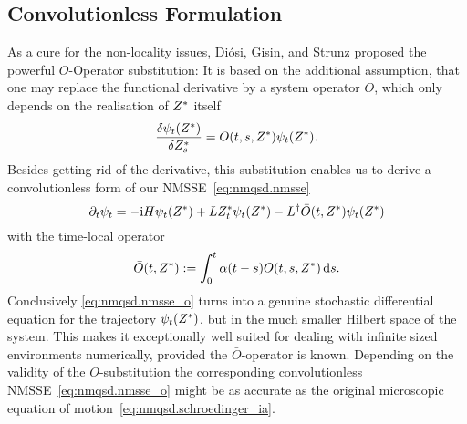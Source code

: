 \subsection{Convolutionless Formulation}
\label{sub:nmqsd.lin_nmsse.convolutionless}

As a cure for the non-locality issues, Diósi, Gisin, and Strunz \cite{DiGiSt98_nmqsd} proposed the powerful $O$-Operator substitution:
It is based on the additional assumption, that one may replace the functional derivative by a system operator $O$, which only depends on the realisation of ${Z}^*$ itself
\begin{equation}
  \frac{\delta \psi_t({Z}^*)}{\delta {Z}^*_s} = O(t, s, {Z}^*) \psi_t({Z}^*).
  \label{eq:nmqsd.o_substition}
\end{equation}
Besides getting rid of the derivative, this substitution enables us to derive a convolutionless form of our NMSSE~\ref{eq:nmqsd.nmsse}
\begin{equation}
  \partial_t \psi_t = -\mathrm{i}H\psi_t({Z}^*)  +  L{Z}^*_t\psi_t({Z}^*)  -  L^\dagger \bar O(t, {Z}^*) \psi_t({Z}^*)
  \label{eq:nmqsd.nmsse_o}
\end{equation}
with the time-local operator
\begin{equation}
  \bar O(t, {Z}^*) := \int_0^t \alpha(t - s) O(t, s, {Z}^*) \, \mathrm{d} s.
  \label{eq:nmqsd.o_bar}
\end{equation}
Conclusively \autoref{eq:nmqsd.nmsse_o} turns into a genuine stochastic differential equation for the trajectory $\psi_t({Z}^*)$, but in the much smaller Hilbert space of the system.
This makes it exceptionally well suited for dealing with infinite sized environments numerically, provided the $\bar O$-operator is known.
Depending on the validity of the $O$-substitution the corresponding convolutionless NMSSE~\ref{eq:nmqsd.nmsse_o} might be as accurate as the original microscopic equation of motion~\ref{eq:nmqsd.schroedinger_ia}.

